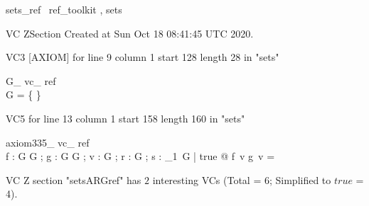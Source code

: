 \documentclass{article}
\begin{document}

\begin{zsection}	 \SECTION sets\_ref \parents~ref\_toolkit , sets
\end{zsection}

VC ZSection Created at Sun Oct 18 08:41:45 UTC 2020.

VC3 [AXIOM] for line 9 column 1 start 128 length 28 in "sets"
\begin{theorem}{ G\_ vc\_ ref}\\
 \lnot G = \{ \} \\

\end{theorem}

VC5 for line 13 column 1 start 158 length 160 in "sets"
\begin{theorem}{ axiom335\_ vc\_ ref}\\
 \exists f : G \rel \power G ; g : G \fun \power G ; v : G ; r : \finset G ; s : {\finset}_{1}~G | true @ f~v \cap g~v =~\emptyset \\

\end{theorem}



 VC Z section "setsARGref" has $2$ interesting VCs (Total = 6; Simplified to $true$ = 4).



\end{document}
